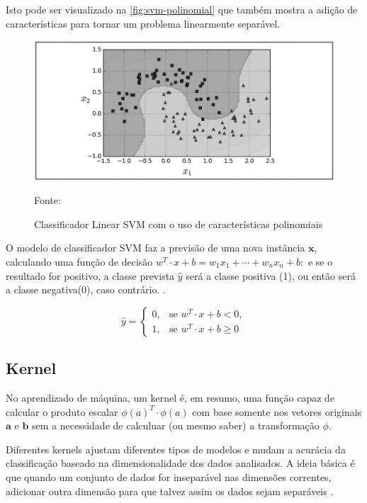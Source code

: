 Isto pode ser visualizado na \autoref{fig:svm-polinomial} que também mostra a adição de características para tornar um problema linearmente separável.
\begin{figure}[h!]
	\centering
	\caption{Classificador Linear SVM com o uso de características polinomiais}
	\includegraphics[width=.8\textwidth]{imagens/svm-polinomial.png}
		
	\label{fig:svm-polinomial}
	{\scriptsize 	Fonte: }
\end{figure}

O modelo de classificador SVM faz a previsão de uma nova instância $\textbf{x}$, calculando uma função de decisão $w^T \cdot x + b = w_1 x_1 + \cdots + w_n x_n + b:$ e se o resultado for positivo, a classe prevista $\hat{y}$ será a classe positiva (1), ou então será a classe negativa(0), caso contrário. \cite{soman_machine_2009}.

\begin{equation}
\hat{y} = \left \{ \begin{matrix} 0, & \mbox{se }w^T \cdot x + b < 0, \\ 
							      1, & \mbox{se }w^T \cdot x + b \ge 0 \end{matrix} \right.
\end{equation}

\subsection{Kernel}\label{kernel}
No aprendizado de máquina, um kernel é, em resumo, uma função capaz de calcular o produto escalar $\phi (a)^T \cdot \phi (a)$ com base somente nos vetores originais $\textbf{a}$ e $\textbf{b}$ sem a necessidade de calculuar (ou mesmo saber) a transformação $\phi$. 

Diferentes kernels ajustam diferentes tipos de modelos e mudam a acurácia da classificação baseado na dimensionalidade dos dados analisados. A ideia básica é que quando um conjunto de dados for inseparável nas dimensões correntes, adicionar outra dimensão para que talvez assim os dados sejam separáveis \cite{geron_maos_2020, soman_machine_2009}.

